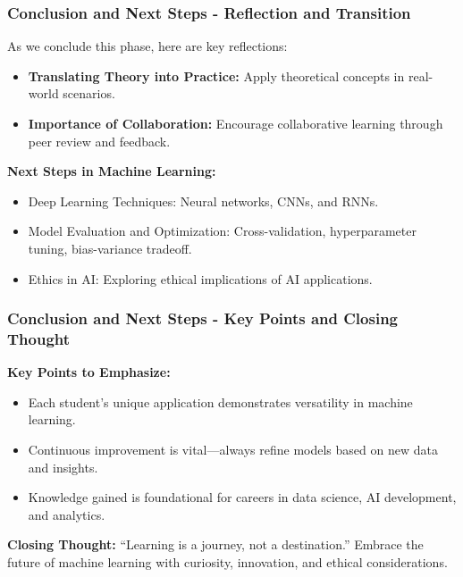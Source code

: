 \documentclass[aspectratio=169]{beamer}
\begin{document}
\begin{frame}[fragile]
    \frametitle{Conclusion and Next Steps - Reflection and Transition}
    As we conclude this phase, here are key reflections:
    \begin{itemize}
        \item \textbf{Translating Theory into Practice:} Apply theoretical concepts in real-world scenarios.
        \item \textbf{Importance of Collaboration:} Encourage collaborative learning through peer review and feedback.
    \end{itemize}
    
    \textbf{Next Steps in Machine Learning:}
    \begin{itemize}
        \item Deep Learning Techniques: Neural networks, CNNs, and RNNs.
        \item Model Evaluation and Optimization: Cross-validation, hyperparameter tuning, bias-variance tradeoff.
        \item Ethics in AI: Exploring ethical implications of AI applications.
    \end{itemize}
\end{frame}

\begin{frame}[fragile]
    \frametitle{Conclusion and Next Steps - Key Points and Closing Thought}
    \textbf{Key Points to Emphasize:}
    \begin{itemize}
        \item Each student's unique application demonstrates versatility in machine learning.
        \item Continuous improvement is vital—always refine models based on new data and insights.
        \item Knowledge gained is foundational for careers in data science, AI development, and analytics.
    \end{itemize}

    \textbf{Closing Thought:} 
    “Learning is a journey, not a destination.” Embrace the future of machine learning with curiosity, innovation, and ethical considerations.
\end{frame}
\end{document}
